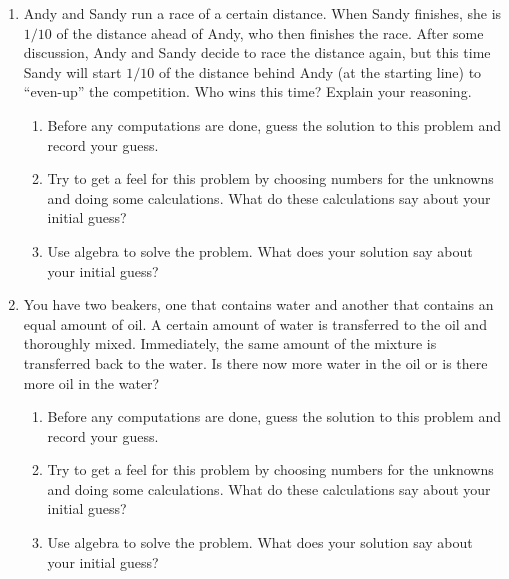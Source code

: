 \begin{problems}
\begin{enumerate}
\item Andy and Sandy run a race of a certain distance. When Sandy finishes, 
she is $1/10$ of the distance ahead of Andy, who then finishes the race. 
After some discussion, Andy and Sandy decide to race the distance again, but this time Sandy
  will start $1/10$ of the distance behind Andy (at the starting line) to ``even-up'' the
  competition. Who wins this time?  Explain your reasoning.  
\begin{enumerate}
\item Before any computations are done, guess the
  solution to this problem and record your guess.  
\item Try to get a feel for this problem by choosing numbers for the
  unknowns and doing some calculations. What do these calculations say
  about your initial guess?
\item Use algebra to solve the problem.  What does your solution say 
about your initial guess?  
\end{enumerate}

\item You have two beakers, one that contains water and another that
  contains an equal amount of oil. A certain amount of water is
  transferred to the oil and thoroughly mixed. Immediately, the same
  amount of the mixture is transferred back to the water. Is there now
  more water in the oil or is there more oil in the water?
\begin{enumerate}
\item Before any computations are done, guess the
  solution to this problem and record your guess.
\item Try to get a feel for this problem by choosing numbers for the
  unknowns and doing some calculations. What do these calculations say
  about your initial guess?
\item Use algebra to solve the problem.  What does your solution say 
about your initial guess?  
\end{enumerate}


\end{enumerate}
\end{problems}
